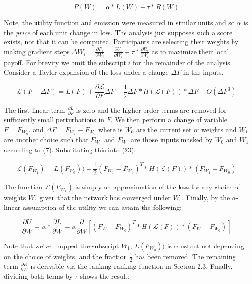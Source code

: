 \documentclass{article}
\begin{document}
\begin{equation}
P(W) = \alpha * L(W) + \tau * R(W)
\end{equation}
\smallskip

Note, the utility function and emission were measured in similar units and so $\alpha$ is the \textit{price} of each unit change in loss. The analysis just supposes such a score exists, not that it can be computed. Participants are selecting their weights by making gradient steps $\Delta W_i = \frac{\partial P_i}{\partial W_i} = \frac{\partial U_i}{\partial W_i} + \tau * \frac{\partial R_i}{\partial W_i}$ as to maximize their local payoff. For brevity we omit the subscript $i$ for the remainder of the analysis. Consider a Taylor expansion of the loss under a change $\Delta F$ in the inputs.

\begin{equation}
\mathcal{L}(F + \Delta F) = L(F) + \frac{\partial \mathcal{L}}{\partial F} \Delta F + \frac{1}{2} \Delta F * H( \mathcal{L} (F) ) * \Delta F + O(\Delta F^3) 
\end{equation}

The first linear term $\frac{\partial L}{\partial F}$ is zero and the higher order terms are removed for sufficiently small perturbations in $F$. We then perform a change of variable $F = F_{W_0}$, and $\Delta F = F_{W_1} - F_{W_0}$ where is $W_0$ are the current set of weights and $W_1$ are another choice such that $F_{W_0}$ and $F_{W_1}$ are those inputs masked by $W_0$ and $W_1$ according to (7). Substituting this into (23):

\begin{equation}
\mathcal{L}(F_{W_1}) = L(F_{W_0})) + \frac{1}{2} (F_{W_1} - F_{W_0})^T * H( \mathcal{L}(F)) * (F_{W_1} - F_{W_0}) 
\end{equation}

The function $\mathcal{L}(F_{W_1})$ is simply an approximation of the loss for any choice of weights $W_1$ given that the network has converged under $W_0$. Finally, by the $\alpha$-linear assumption of the utility we can attain the following: 

\begin{equation}
\frac{\partial U}{\partial W} = \alpha * \frac{\partial L}{\partial W} = \alpha \frac{\partial}{\partial W} [(F_W - F_{W_0})^T * H( \mathcal{L}(F)) * (F_W - F_{W_0}) ]
\end{equation}

Note that we've dropped the subscript $W_1$,  $L(F_{W_0}))$ is constant not depending on the choice of weights, and the fraction $\frac{1}{2}$ has been removed. The remaining term $\frac{\partial R}{\partial W}$ is derivable via the ranking ranking function in Section 2.3.  Finally, dividing both terms by $\tau$ shows the result:
\end{document}
